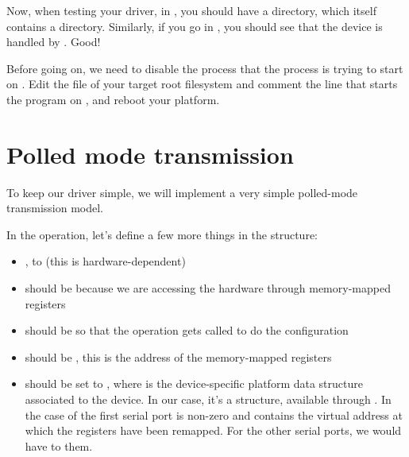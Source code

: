 Now, when testing your driver, in
, you should have a
 directory, which itself contains a 
directory. Similarly, if you go in , you
should see that the  device is handled by
. Good!

Before going on, we need to disable the  process that the
 process is trying to start on . Edit the
 file of your target root filesystem and comment
the line that starts the  program on , and
reboot your platform.

\section{Polled mode transmission}

To keep our driver simple, we will implement a very simple polled-mode
transmission model.

In the  operation, let's define a few more things in the
 structure:

\begin{itemize}

\item {}, to  (this is hardware-dependent)

\item {} should be  because we are
  accessing the hardware through memory-mapped registers

\item {} should be  so that the
   operation gets called to do the configuration

\item {} should be , this is
  the address of the memory-mapped registers

\item {} should be set to , where
   is the device-specific platform data structure associated
  to the device. In our
  case, it's a  structure, available through
  . In the case of the first serial port
   is non-zero and contains the virtual address at
  which the registers have been remapped. For the other serial ports,
  we would have to  them.

\end{itemize}

